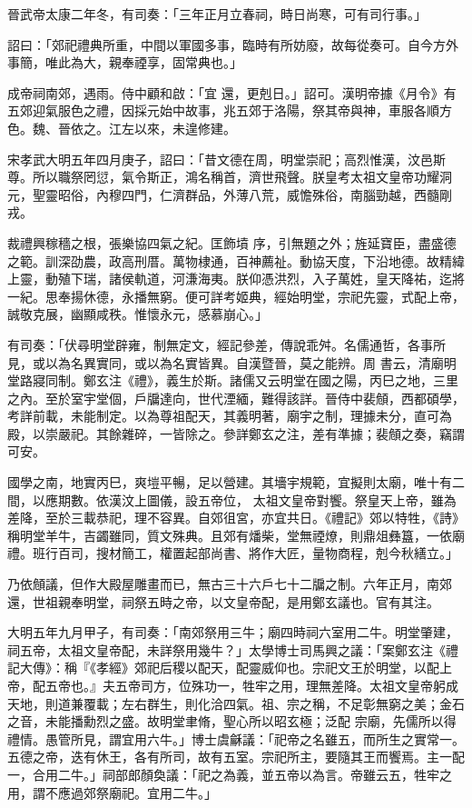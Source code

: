 \begin{pinyinscope}
 晉武帝太康二年冬，有司奏：「三年正月立春祠，時日尚寒，可有司行事。」



 詔曰：「郊祀禮典所重，中間以軍國多事，臨時有所妨廢，故每從奏可。自今方外事簡，唯此為大，親奉禋享，固常典也。」



 成帝祠南郊，遇雨。侍中顧和啟：「宜
 還，更剋日。」詔可。漢明帝據《月令》有五郊迎氣服色之禮，因採元始中故事，兆五郊于洛陽，祭其帝與神，車服各順方色。魏、晉依之。江左以來，未遑修建。



 宋孝武大明五年四月庚子，詔曰：「昔文德在周，明堂崇祀；高烈惟漢，汶邑斯尊。所以職祭罔愆，氣令斯正，鴻名稱首，濟世飛聲。朕皇考太祖文皇帝功耀洞元，聖靈昭俗，內穆四門，仁濟群品，外薄八荒，威憺殊俗，南腦勁越，西髓剛戎。



 裁禮興稼穡之根，張樂協四氣之紀。匡飾墳
 序，引無題之外；旌延寶臣，盡盛德之範。訓深劭農，政高刑厝。萬物棣通，百神薦祉。動協天度，下沿地德。故精緯上靈，動殖下瑞，諸侯軌道，河溓海夷。朕仰憑洪烈，入子萬姓，皇天降祐，迄將一紀。思奉揚休德，永播無窮。便可詳考姬典，經始明堂，宗祀先靈，式配上帝，誠敬克展，幽顯咸秩。惟懷永元，感慕崩心。」



 有司奏：「伏尋明堂辟雍，制無定文，經記參差，傳說乖舛。名儒通哲，各事所見，或以為名異實同，或以為名實皆異。自漢暨晉，莫之能辨。周
 書云，清廟明堂路寢同制。鄭玄注《禮》，義生於斯。諸儒又云明堂在國之陽，丙巳之地，三里之內。至於室宇堂個，戶牖達向，世代湮緬，難得該詳。晉侍中裴頠，西都碩學，考詳前載，未能制定。以為尊祖配天，其義明著，廟宇之制，理據未分，直可為殿，以崇嚴祀。其餘雜碎，一皆除之。參詳鄭玄之注，差有準據；裴頠之奏，竊謂可安。



 國學之南，地實丙巳，爽塏平暢，足以營建。其墻宇規範，宜擬則太廟，唯十有二間，以應期數。依漢汶上圖儀，設五帝位，
 太祖文皇帝對饗。祭皇天上帝，雖為差降，至於三載恭祀，理不容異。自郊徂宮，亦宜共日。《禮記》郊以特牲，《詩》稱明堂羊牛，吉蠲雖同，質文殊典。且郊有燔柴，堂無禋燎，則鼎俎彝簋，一依廟禮。班行百司，搜材簡工，權置起部尚書、將作大匠，量物商程，剋今秋繕立。」



 乃依頠議，但作大殿屋雕畫而已，無古三十六戶七十二牖之制。六年正月，南郊還，世祖親奉明堂，祠祭五時之帝，以文皇帝配，是用鄭玄議也。官有其注。



 大明五年九月甲子，有司奏：「南郊祭用三牛；廟四時祠六室用二牛。明堂肇建，祠五帝，太祖文皇帝配，未詳祭用幾牛？」太學博士司馬興之議：「案鄭玄注《禮記大傳》：稱『《孝經》郊祀后稷以配天，配靈威仰也。宗祀文王於明堂，以配上帝，配五帝也。』夫五帝司方，位殊功一，牲牢之用，理無差降。太祖文皇帝躬成天地，則道兼覆載；左右群生，則化洽四氣。祖、宗之稱，不足彰無窮之美；金石之音，未能播勳烈之盛。故明堂聿脩，聖心所以昭玄極；泛配
 宗廟，先儒所以得禮情。愚管所見，謂宜用六牛。」博士虞龢議：「祀帝之名雖五，而所生之實常一。五德之帝，迭有休王，各有所司，故有五室。宗祀所主，要隨其王而饗焉。主一配一，合用二牛。」祠部郎顏奐議：「祀之為義，並五帝以為言。帝雖云五，牲牢之用，謂不應過郊祭廟祀。宜用二牛。」




\end{pinyinscope}
